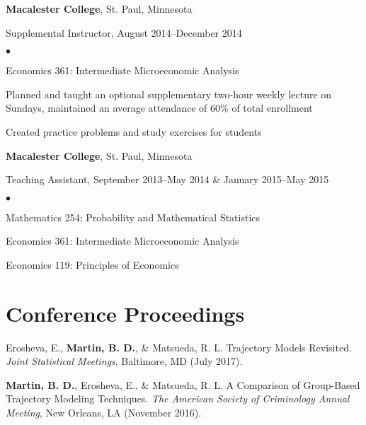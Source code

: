 \documentclass[margin,centered]{res}
\newenvironment{list1}{
  \begin{list}{\ding{113}}{%
      \setlength{\itemsep}{0in}
      \setlength{\parsep}{0in} \setlength{\parskip}{0in}
      \setlength{\topsep}{0in} \setlength{\partopsep}{0in}
      \setlength{\leftmargin}{0.17in}}}{\end{list}}
\newenvironment{list2}{
  \begin{list}{$\bullet$}{%
      \setlength{\itemsep}{0in}
      \setlength{\parsep}{0in} \setlength{\parskip}{0in}
      \setlength{\topsep}{0in} \setlength{\partopsep}{0in}
      \setlength{\leftmargin}{0.2in}}}{\end{list}}
\begin{document}
\begin{resume}
{\bf Macalester College}, St. Paul, Minnesota
\begin{list1}
\item[] Supplemental Instructor, August 2014--December 2014
\begin{list2}
\vspace*{.05in}
\item Economics 361: Intermediate Microeconomic Analysis
\item Planned and taught an optional supplementary two-hour weekly lecture on Sundays, maintained an average attendance of 60\% of total enrollment
\item Created practice problems and study exercises for students
\end{list2}
\end{list1}

{\bf Macalester College}, St. Paul, Minnesota
\begin{list1}
\item[] Teaching Assistant, September 2013--May 2014 \& January 2015--May 2015
\begin{list2}
\vspace*{.05in}
\item Mathematics 254: Probability and Mathematical Statistics
\item Economics 361: Intermediate Microeconomic Analysis
\item Economics 119: Principles of Economics
\end{list2}
\end{list1}

\section{\sc Conference Proceedings}
Erosheva, E., \textbf{Martin, B. D.}, \& Matsueda, R. L. Trajectory Models Revisited. \textit{Joint Statistical Meetings}, Baltimore, MD (July 2017).

\textbf{Martin, B. D.}, Erosheva, E., \& Matsueda, R. L. A Comparison of Group-Based Trajectory Modeling Techniques. \textit{The American Society of Criminology Annual Meeting}, New Orleans, LA (November 2016).


\end{resume}
\end{document}
